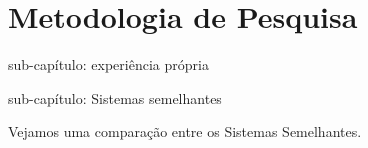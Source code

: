 \documentclass[ppginf, pep]{esinucpel}
\begin{document}
\chapter{Metodologia de Pesquisa}

sub-capítulo: experiência própria

sub-capítulo: Sistemas semelhantes

Vejamos uma comparação entre os Sistemas Semelhantes.


%
%
%
\end{document}
